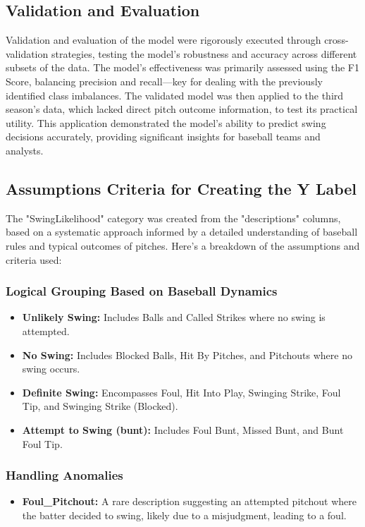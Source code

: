 \documentclass[12pt]{article}
\begin{document}
\subsection{Validation and Evaluation}
Validation and evaluation of the model were rigorously executed through cross-validation strategies, testing the model’s robustness and accuracy across different subsets of the data. The model's effectiveness was primarily assessed using the F1 Score, balancing precision and recall—key for dealing with the previously identified class imbalances. The validated model was then applied to the third season's data, which lacked direct pitch outcome information, to test its practical utility. This application demonstrated the model's ability to predict swing decisions accurately, providing significant insights for baseball teams and analysts.

\subsection{Assumptions Criteria for Creating the Y Label}
The "SwingLikelihood" category was created from the "descriptions" columns, based on a systematic approach informed by a detailed understanding of baseball rules and typical outcomes of pitches. Here's a breakdown of the assumptions and criteria used:

\subsubsection{Logical Grouping Based on Baseball Dynamics}
\begin{itemize}
    \item \textbf{Unlikely Swing:} Includes Balls and Called Strikes where no swing is attempted.
    \item \textbf{No Swing:} Includes Blocked Balls, Hit By Pitches, and Pitchouts where no swing occurs.
    \item \textbf{Definite Swing:} Encompasses Foul, Hit Into Play, Swinging Strike, Foul Tip, and Swinging Strike (Blocked).
    \item \textbf{Attempt to Swing (bunt):} Includes Foul Bunt, Missed Bunt, and Bunt Foul Tip.
\end{itemize}

\subsubsection{Handling Anomalies}
\begin{itemize}
    \item \textbf{Foul\_Pitchout:} A rare description suggesting an attempted pitchout where the batter decided to swing, likely due to a misjudgment, leading to a foul.
\end{itemize}
\end{document}

